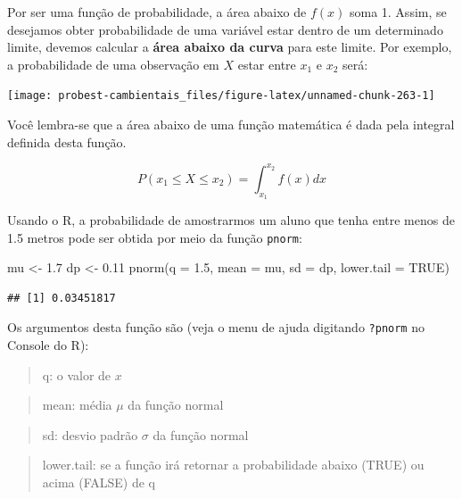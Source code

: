 \documentclass[
]{book}
\newenvironment{Shaded}{\begin{snugshade}}{\end{snugshade}}
\newcommand{\AttributeTok}[1]{\textcolor[rgb]{0.77,0.63,0.00}{#1}}
\newcommand{\ConstantTok}[1]{\textcolor[rgb]{0.00,0.00,0.00}{#1}}
\newcommand{\FloatTok}[1]{\textcolor[rgb]{0.00,0.00,0.81}{#1}}
\newcommand{\FunctionTok}[1]{\textcolor[rgb]{0.00,0.00,0.00}{#1}}
\newcommand{\NormalTok}[1]{#1}
\newcommand{\OtherTok}[1]{\textcolor[rgb]{0.56,0.35,0.01}{#1}}
\begin{document}
Por ser uma função de probabilidade, a área abaixo de \(f(x)\) soma 1. Assim, se desejamos obter probabilidade de uma variável estar dentro de um determinado limite, devemos calcular a \textbf{área abaixo da curva} para este limite. Por exemplo, a probabilidade de uma observação em \(X\) estar entre \(x_1\) e \(x_2\) será:

\begin{center}\texttt{[image: probest-cambientais\_files/figure-latex/unnamed-chunk-263-1]} \end{center}

Você lembra-se que a área abaixo de uma função matemática é dada pela integral definida desta função.

\[P(x_1 \le X \le x_2) = \int_{x_1}^{x_2}f(x) dx\]

Usando o R, a probabilidade de amostrarmos um aluno que tenha entre menos de 1.5 metros pode ser obtida por meio da função \texttt{pnorm}:

\begin{Shaded}
\begin{Highlighting}[]
\NormalTok{mu }\OtherTok{\textless{}{-}} \FloatTok{1.7}
\NormalTok{dp }\OtherTok{\textless{}{-}} \FloatTok{0.11}
\FunctionTok{pnorm}\NormalTok{(}\AttributeTok{q =} \FloatTok{1.5}\NormalTok{, }\AttributeTok{mean =}\NormalTok{ mu, }\AttributeTok{sd =}\NormalTok{ dp, }\AttributeTok{lower.tail =} \ConstantTok{TRUE}\NormalTok{)}
\end{Highlighting}
\end{Shaded}

\begin{verbatim}
## [1] 0.03451817
\end{verbatim}

Os argumentos desta função são (veja o menu de ajuda digitando \texttt{?pnorm} no Console do R):

\begin{quote}
q: o valor de \(x\)
\end{quote}

\begin{quote}
mean: média \(\mu\) da função normal
\end{quote}

\begin{quote}
sd: desvio padrão \(\sigma\) da função normal
\end{quote}

\begin{quote}
lower.tail: se a função irá retornar a probabilidade abaixo (TRUE) ou acima (FALSE) de q
\end{quote}
\end{document}
